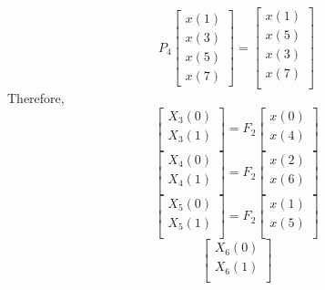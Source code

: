 \documentclass[journal,12pt,twocolumn]{IEEEtran}
\renewcommand\thesection{\arabic{section}}
\begin{document}
\begin{enumerate}[label=\thesection.\arabic*.,ref=\thesection.\theenumi]
\begin{equation}
\end{equation}
\begin{equation}
P_{4}
\begin{bmatrix}
x(1) \\ 
x(3) \\ 
x(5) \\
x(7)
\end{bmatrix}
 = 
\begin{bmatrix}
x(1) \\ 
x(5) \\ 
x(3) \\ 
x(7) \\
\end{bmatrix}
\end{equation}
Therefore,
\begin{equation}
\begin{bmatrix}
X_{3}(0) \\ 
X_{3}(1)\\ 
\end{bmatrix}
= F_{2}
\begin{bmatrix}
x(0) \\ 
x(4) \\ 
\end{bmatrix}
\end{equation}
\begin{equation}
\begin{bmatrix}
X_{4}(0) \\ 
X_{4}(1)\\ 
\end{bmatrix}
= F_{2}
\begin{bmatrix}
x(2) \\ 
x(6) \\ 
\end{bmatrix}
\end{equation}
\begin{equation}
\begin{bmatrix}
X_{5}(0) \\ 
X_{5}(1)\\ 
\end{bmatrix}
= F_{2}
\begin{bmatrix}
x(1) \\ 
x(5) \\ 
\end{bmatrix}
\end{equation}
\begin{equation}
\begin{bmatrix}
X_{6}(0) \\ 
X_{6}(1)\\ 

\end{bmatrix}
\end{equation}
\end{enumerate}
\end{document}
